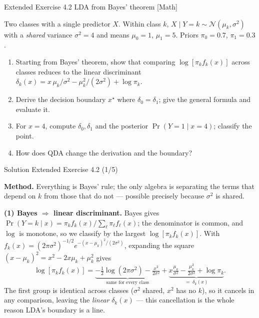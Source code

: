 \documentclass[aspectratio=169,11pt]{beamer}
\begin{document}
\begin{frame}{Extended Exercise 4.2 \textemdash{} LDA from Bayes' theorem [Math]}\label{frm:ee42}
\begin{longexercise}
Two classes with a single predictor $X$. Within class $k$,
$X\mid Y=k\sim\mathcal{N}(\mu_k,\sigma^2)$ with a \emph{shared} variance
$\sigma^2=4$ and means $\mu_0=1$, $\mu_1=5$. Priors $\pi_0=0.7$,
$\pi_1=0.3$.
\begin{enumerate}
  \item Starting from Bayes' theorem, show that comparing
        $\log[\pi_k f_k(x)]$ across classes reduces to the linear
        discriminant
        $\delta_k(x)=x\,\mu_k/\sigma^2-\mu_k^2/(2\sigma^2)+\log\pi_k$.
  \item Derive the decision boundary $x^\star$ where
        $\delta_0=\delta_1$; give the general formula and evaluate it.
  \item For $x=4$, compute $\delta_0,\delta_1$ and the posterior
        $\Pr(Y=1\mid x=4)$; classify the point.
  \item How does QDA change the derivation and the boundary?
\end{enumerate}
\end{longexercise}
\end{frame}

\begin{frame}{Solution \textemdash{} Extended Exercise 4.2 (1/5)}
\begin{solutionbox}
\textbf{Method.} Everything is Bayes' rule; the only algebra is
separating the terms that depend on $k$ from those that do not ---
possible precisely because $\sigma^2$ is shared.

\vspace{1mm}
\textbf{(1) Bayes $\Rightarrow$ linear discriminant.}
Bayes gives $\Pr(Y=k\mid x)=\pi_k f_k(x)/\sum_\ell \pi_\ell f_\ell(x)$;
the denominator is common, and $\log$ is monotone, so we classify by
the largest $\log[\pi_k f_k(x)]$. With
$f_k(x)=(2\pi\sigma^2)^{-1/2}e^{-(x-\mu_k)^2/(2\sigma^2)}$, expanding
the square $(x-\mu_k)^2 = x^2 - 2x\mu_k + \mu_k^2$ gives
\[
  \log[\pi_k f_k(x)]=
  \underbrace{-\tfrac12\log(2\pi\sigma^2)-\tfrac{x^2}{2\sigma^2}}_{\text{same for every class}}
  +\underbrace{x\tfrac{\mu_k}{\sigma^2}-\tfrac{\mu_k^2}{2\sigma^2}+\log\pi_k}_{=\;\delta_k(x)} .
\]
The first group is identical across classes ($\sigma^2$ shared, $x^2$ has
no $k$), so it cancels in any comparison, leaving the \emph{linear}
$\delta_k(x)$ --- this cancellation is the whole reason LDA's boundary
is a line.
\end{solutionbox}
\end{frame}
\end{document}
